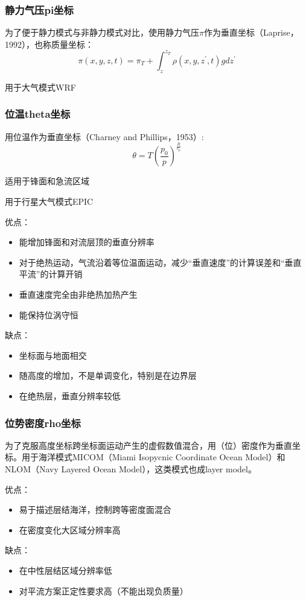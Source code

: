 \documentclass{article}
\begin{document}
\subsubsection{静力气压pi坐标}
为了便于静力模式与非静力模式对比，使用静力气压$\pi$作为垂直坐标（Laprise，1992），也称质量坐标：
$$\pi(x,y,z,t)=\pi_T+\int^{z_T}_{z}{\rho(x,y,z^{\prime},t)g} dz^{\prime}$$

用于大气模式WRF

\subsubsection{位温theta坐标}
用位温作为垂直坐标（Charney and Phillips，1953）:
$$\theta=T(\frac{p_0}{p})^{\frac{R}{c_p}}$$

适用于锋面和急流区域

用于行星大气模式EPIC

优点：
\begin{itemize}
    \item 能增加锋面和对流层顶的垂直分辨率
    \item 对于绝热运动，气流沿着等位温面运动，减少“垂直速度”的计算误差和“垂直平流”的计算开销
    \item 垂直速度完全由非绝热加热产生
    \item 能保持位涡守恒
\end{itemize}

缺点：
\begin{itemize}
    \item 坐标面与地面相交
    \item 随高度的增加，不是单调变化，特别是在边界层
    \item 在绝热层，垂直分辨率较低
\end{itemize}

\subsubsection{位势密度rho坐标}
为了克服高度坐标跨坐标面运动产生的虚假数值混合，用（位）密度作为垂直坐标。用于海洋模式MICOM（Miami Isopycnic Coordinate Ocean Model）和NLOM（Navy Layered Ocean Model），这类模式也成layer model。


优点：
\begin{itemize}
    \item 易于描述层结海洋，控制跨等密度面混合
    \item 在密度变化大区域分辨率高
\end{itemize}

缺点：
\begin{itemize}
    \item 在中性层结区域分辨率低
    \item 对平流方案正定性要求高（不能出现负质量）
\end{itemize}
\end{document}
